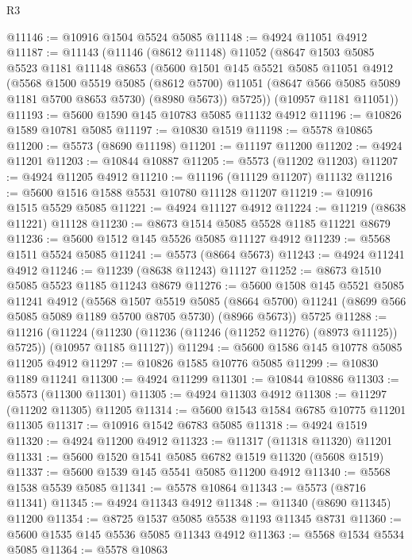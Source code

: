 \begin{lexlean}{R3}
\begin{coremodule}
@11146 := @10916 @1504 @5524 @5085
@11148 := @4924 @11051 @4912
@11187 := @11143
    (@11146
      (@8612 @11148)
      @11052
      (@8647
        @1503
        @5085
        @5523
        @1181
        @11148
        @8653
        (@5600
          @1501
          @145
          @5521
          @5085
          @11051
          @4912
          (@5568
            @1500
            @5519
            @5085
            (@8612 @5700)
            @11051
            (@8647 @566 @5085 @5089 @1181 @5700 @8653 @5730)
            (@8980 @5673))
          @5725))
      (@10957 @1181 @11051))
@11193 := @5600 @1590 @145 @10783 @5085 @11132 @4912
@11196 := @10826 @1589 @10781 @5085
@11197 := @10830 @1519
@11198 := @5578 @10865
@11200 := @5573 (@8690 @11198)
@11201 := @11197 @11200
@11202 := @4924 @11201
@11203 := @10844 @10887
@11205 := @5573 (@11202 @11203)
@11207 := @4924 @11205 @4912
@11210 := @11196 (@11129 @11207) @11132
@11216 := @5600 @1516 @1588 @5531 @10780 @11128 @11207
@11219 := @10916 @1515 @5529 @5085
@11221 := @4924 @11127 @4912
@11224 := @11219 (@8638 @11221) @11128
@11230 := @8673 @1514 @5085 @5528 @1185 @11221 @8679
@11236 := @5600 @1512 @145 @5526 @5085 @11127 @4912
@11239 := @5568 @1511 @5524 @5085
@11241 := @5573 (@8664 @5673)
@11243 := @4924 @11241 @4912
@11246 := @11239 (@8638 @11243) @11127
@11252 := @8673 @1510 @5085 @5523 @1185 @11243 @8679
@11276 := @5600
    @1508
    @145
    @5521
    @5085
    @11241
    @4912
    (@5568
      @1507
      @5519
      @5085
      (@8664 @5700)
      @11241
      (@8699 @566 @5085 @5089 @1189 @5700 @8705 @5730)
      (@8966 @5673))
    @5725
@11288 := @11216
    (@11224 (@11230 (@11236 (@11246 (@11252 @11276) (@8973 @11125)) @5725)) (@10957 @1185 @11127))
@11294 := @5600 @1586 @145 @10778 @5085 @11205 @4912
@11297 := @10826 @1585 @10776 @5085
@11299 := @10830 @1189 @11241
@11300 := @4924 @11299
@11301 := @10844 @10886
@11303 := @5573 (@11300 @11301)
@11305 := @4924 @11303 @4912
@11308 := @11297 (@11202 @11305) @11205
@11314 := @5600 @1543 @1584 @6785 @10775 @11201 @11305
@11317 := @10916 @1542 @6783 @5085
@11318 := @4924 @1519
@11320 := @4924 @11200 @4912
@11323 := @11317 (@11318 @11320) @11201
@11331 := @5600 @1520 @1541 @5085 @6782 @1519 @11320 (@5608 @1519)
@11337 := @5600 @1539 @145 @5541 @5085 @11200 @4912
@11340 := @5568 @1538 @5539 @5085
@11341 := @5578 @10864
@11343 := @5573 (@8716 @11341)
@11345 := @4924 @11343 @4912
@11348 := @11340 (@8690 @11345) @11200
@11354 := @8725 @1537 @5085 @5538 @1193 @11345 @8731
@11360 := @5600 @1535 @145 @5536 @5085 @11343 @4912
@11363 := @5568 @1534 @5534 @5085
@11364 := @5578 @10863

\end{coremodule}
\end{lexlean}
